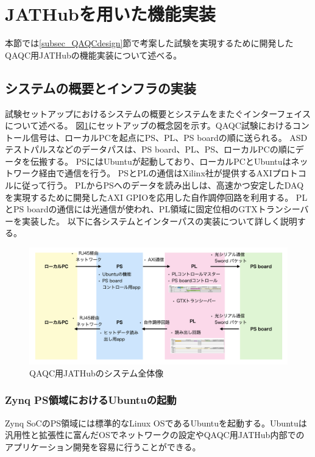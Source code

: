 \section{JATHubを用いた機能実装}
\label{sec_QAQC_JATHub}
本節では\ref{subsec_QAQCdesign}節で考案した試験を実現するために開発したQAQC用JATHubの機能実装について述べる。

\subsection{システムの概要とインフラの実装}
\label{subsec_infra}
試験セットアップにおけるシステムの概要とシステムをまたぐインターフェイスについて述べる。
図\ref{JAThubinfra}にセットアップの概念図を示す。QAQC試験におけるコントール信号は、ローカルPCを起点にPS、PL、PS boardの順に送られる。
ASDテストパルスなどのデータパスは、PS board、PL、PS、ローカルPCの順にデータを伝搬する。
PSにはUbuntuが起動しており、ローカルPCとUbuntuはネットワーク経由で通信を行う。
PSとPLの通信はXilinx社が提供するAXIプロトコルに従って行う。
PLからPSへのデータを読み出しは、高速かつ安定したDAQを実現するために開発したAXI GPIOを応用した自作調停回路を利用する。
PLとPS boardの通信には光通信が使われ、PL領域に固定位相のGTXトランシーバーを実装した。
以下に各システムとインターパスの実装について詳しく説明する。

\begin{figure} 
\centering
\includegraphics[width=16cm]{fig/QAQC/JAThubinfra.png}
\caption[QAQC用JATHubのシステム全体像]{QAQC用JATHubのシステム全体像}
\label{JAThubinfra}
\end{figure}

\subsubsection{Zynq PS領域におけるUbuntuの起動}
\label{subsubsec_ubuntu}
\baselineskip
Zynq SoCのPS領域には標準的なLinux OSであるUbuntuを起動する。Ubuntuは汎用性と拡張性に富んだOSでネットワークの設定やQAQC用JATHub内部でのアプリケーション開発を容易に行うことができる。\par

